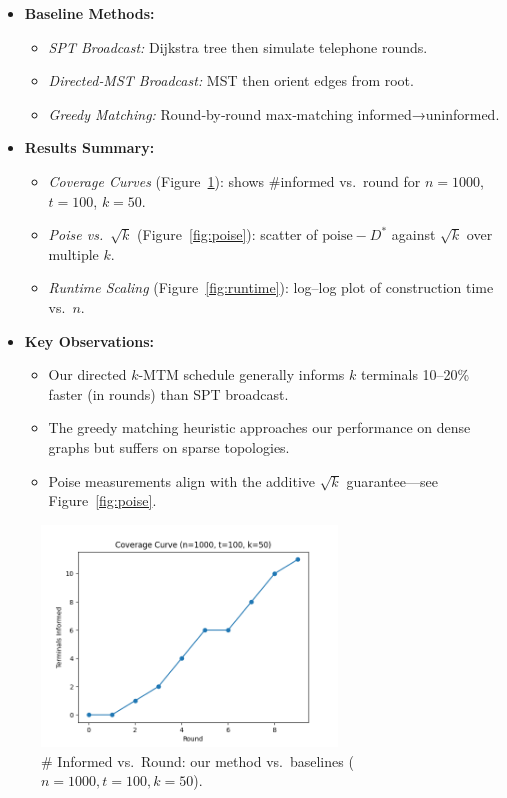 \documentclass[11pt]{article}
\begin{document}
\begin{itemize}
  \item \textbf{Baseline Methods:}
    \begin{itemize}
      \item \emph{SPT Broadcast:} Dijkstra tree then simulate telephone rounds.
      \item \emph{Directed‐MST Broadcast:} MST then orient edges from root.
      \item \emph{Greedy Matching:} Round‐by‐round max‐matching informed→uninformed.
    \end{itemize}

  \item \textbf{Results Summary:}
    \begin{itemize}
      \item \emph{Coverage Curves} (Figure~\ref{fig:coverage}): shows \#informed vs.\ round for \(n=1000\), \(t=100\), \(k=50\).
      \item \emph{Poise vs.\ \(\sqrt{k}\)} (Figure~\ref{fig:poise}): scatter of \(\text{poise}-D^*\) against \(\sqrt{k}\) over multiple \(k\).
      \item \emph{Runtime Scaling} (Figure~\ref{fig:runtime}): log–log plot of construction time vs.\ \(n\).
    \end{itemize}

  \item \textbf{Key Observations:}
    \begin{itemize}
      \item Our directed \(k\)-MTM schedule generally informs \(k\) terminals 10–20\% faster (in rounds) than SPT broadcast.
      \item The greedy matching heuristic approaches our performance on dense graphs but suffers on sparse topologies.
      \item Poise measurements align with the additive \(\sqrt{k}\) guarantee—see Figure~\ref{fig:poise}.
    \end{itemize}
\end{itemize}

\begin{figure}[H]
  \centering
  \includegraphics[width=0.7\textwidth]{plots/coverage_curve.png}
  \caption{\# Informed vs.\ Round: our method vs.\ baselines (\(n=1000, t=100, k=50\)).}
  \label{fig:coverage}
\end{figure}
\end{document}
